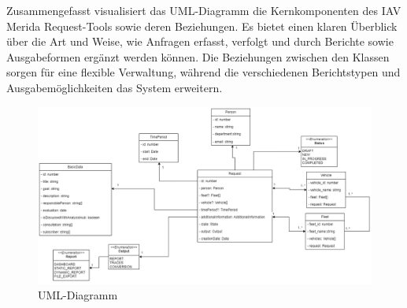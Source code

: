 Zusammengefasst visualisiert das UML-Diagramm die Kernkomponenten des IAV Merida Request-Tools sowie deren Beziehungen. Es bietet einen klaren Überblick über die Art und Weise, wie Anfragen erfasst, verfolgt und durch Berichte sowie Ausgabeformen ergänzt werden können. Die Beziehungen zwischen den Klassen sorgen für eine flexible Verwaltung, während die verschiedenen Berichtstypen und Ausgabemöglichkeiten das System erweitern.
\begin{figure}[H]
    \centering
    \includegraphics[angle=90, scale=.45]{media/UML_Diagramm}
    \caption{UML-Diagramm}
    \label{fig:UML_Diagramm}
\end{figure}
\label{chap:kapitel5}